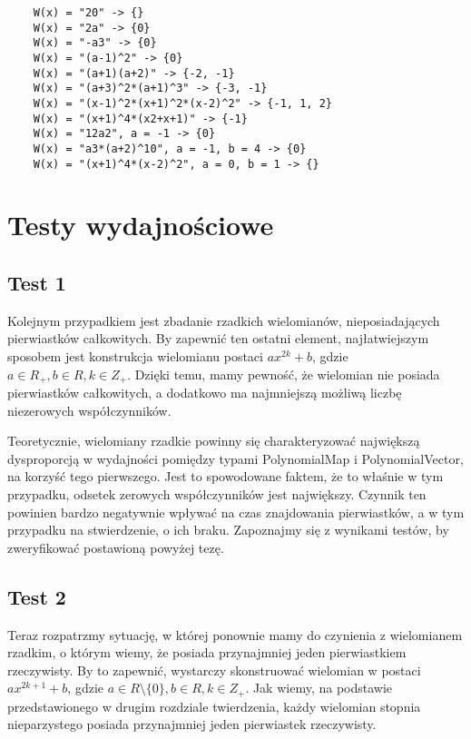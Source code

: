 \documentclass[oneside,a4paper]{book}
\begin{document}
	\begin{lstlisting}
	W(x) = "20" -> {}
	W(x) = "2a" -> {0}
	W(x) = "-a3" -> {0}
	W(x) = "(a-1)^2" -> {0}
	W(x) = "(a+1)(a+2)" -> {-2, -1}
	W(x) = "(a+3)^2*(a+1)^3" -> {-3, -1}
	W(x) = "(x-1)^2*(x+1)^2*(x-2)^2" -> {-1, 1, 2}
	W(x) = "(x+1)^4*(x2+x+1)" -> {-1}
	W(x) = "12a2", a = -1 -> {0}
	W(x) = "a3*(a+2)^10", a = -1, b = 4 -> {0}
	W(x) = "(x+1)^4*(x-2)^2", a = 0, b = 1 -> {}
	\end{lstlisting}
	
	\section{Testy wydajnościowe}
	
	
	\subsection{Test 1}
	
	Kolejnym przypadkiem jest zbadanie rzadkich wielomianów, nieposiadających pierwiastków całkowitych. By zapewnić ten ostatni element, najłatwiejszym sposobem jest konstrukcja wielomianu postaci $ax^{2k}+b$, gdzie $a \in R_+, b \in R, k \in Z_+$. Dzięki temu, mamy pewność, że wielomian nie posiada pierwiastków całkowitych, a dodatkowo ma najmniejszą możliwą liczbę niezerowych współczynników.
	
	Teoretycznie, wielomiany rzadkie powinny się charakteryzować największą dysproporcją w wydajności pomiędzy typami PolynomialMap i PolynomialVector, na korzyść tego pierwszego. Jest to spowodowane faktem, że to właśnie w tym przypadku, odsetek zerowych współczynników jest największy. Czynnik ten powinien bardzo negatywnie wpływać na czas znajdowania pierwiastków, a w tym przypadku na stwierdzenie, o ich braku. Zapoznajmy się z wynikami testów, by zweryfikować postawioną powyżej tezę.
	
	\subsection{Test 2}
	
	Teraz rozpatrzmy sytuację, w której ponownie mamy do czynienia z wielomianem rzadkim, o którym wiemy, że posiada przynajmniej jeden pierwiastkiem rzeczywisty. By to zapewnić, wystarczy skonstruować wielomian w postaci $ax^{2k+1}+b$, gdzie $a \in R\setminus\{0\}, b \in R, k \in Z_+$. Jak wiemy, na podstawie przedstawionego w drugim rozdziale twierdzenia, każdy wielomian stopnia nieparzystego posiada przynajmniej jeden pierwiastek rzeczywisty. 
	
\end{document}
